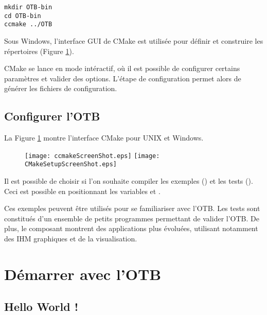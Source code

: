 \small
\begin{verbatim}
mkdir OTB-bin
cd OTB-bin
ccmake ../OTB
\end{verbatim}
\normalsize

Sous Windows, l'interface GUI de CMake est utilis\'{e}e pour d\'{e}finir et construire les r\'{e}pertoires (Figure \ref{fig:CMakeGUI}).

CMake se lance en mode int\'{e}ractif, o\`{u} il est possible de configurer certains param\`{e}tres et valider des options.
L'\'{e}tape de configuration permet alors de g\'{e}n\'{e}rer les fichiers de configuration.


\subsection{Configurer l'OTB}
\label{sec:ConfiguringITKwithVTK}
  

La Figure \ref{fig:CMakeGUI} montre l'interface CMake pour UNIX et Windows.

\begin{figure}[ht]
\centering 
\texttt{[image: ccmakeScreenShot.eps]}
\texttt{[image: CMakeSetupScreenShot.eps]}
\label{fig:CMakeGUI}
\end{figure}

Il est possible de choisir si l'on souhaite compiler les exemples () et les tests ().
Ceci est possible en positionnant les variables  et .

Ces exemples peuvent \^{e}tre utilis\'{e}s pour se familiariser avec l'OTB. Les tests sont constitu\'{e}s 
d'un ensemble de petits programmes permettant de valider l'OTB.
De plus, le composant  montrent des applications plus \'{e}volu\'{e}es, utilisant notamment des IHM 
graphiques et de la visualisation.


\section{D\'{e}marrer avec l'OTB}
\label{sec:GettingStartedWithOTB}
 
\subsection{Hello World !}
\label{sec:HelloWorldOTB}

